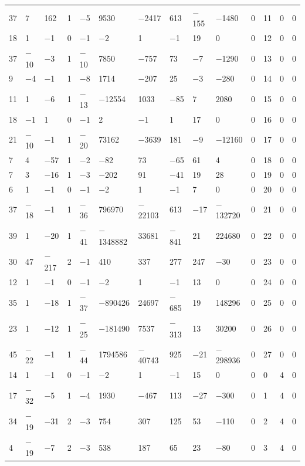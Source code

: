 \documentclass[pdftex]{sigma}
\numberwithin{equation}{section}
\theoremstyle{definition}
\numberwithin{table}{section}
\begin{document}
{\begin{paracol}{3}
\begin{supertabular}{|w{c}{.32cm}w{c}{.32cm}w{c}{.32cm}@{\hspace{.5cm}}w{c}{.2cm}w{c}{.2cm}|@{\hspace{\tabcolsep}}HHHHHHw{c}{.17cm}w{c}{.17cm}w{c}{.17cm}|}
			37 & 7 & 162 & 1 & $-$5 & 9530 & $-$2417 & 613 & $-$155 & $-$1480 & 0 & 11 & 0 & 0 \\
			18 & 1 & $-$1 & 0 & $-$1 & $-$2 & 1 & $-$1 & 19 & 0 & 0 & 12 & 0 & 0 \\
			37 & $-$10 & $-$3 & 1 & $-$10 & 7850 & $-$757 & 73 & $-$7 & $-$1290 & 0 & 13 & 0 & 0 \\
			9 & $-$4 & $-$1 & 1 & $-$8 & 1714 & $-$207 & 25 & $-$3 & $-$280 & 0 & 14 & 0 & 0 \\
			11 & 1 & $-$6 & 1 & $-$13 & $-$12554 & 1033 & $-$85 & 7 & 2080 & 0 & 15 & 0 & 0 \\
			18 & $-$1 & 1 & 0 & $-$1 & 2 & $-$1 & 1 & 17 & 0 & 0 & 16 & 0 & 0 \\
			21 & $-$10 & $-$1 & 1 & $-$20 & 73162 & $-$3639 & 181 & $-$9 & $-$12160 & 0 & 17 & 0 & 0 \\
			7 & 4 & $-$57 & 1 & $-$2 & $-$82 & 73 & $-$65 & 61 & 4 & 0 & 18 & 0 & 0 \\
			7 & 3 & $-$16 & 1 & $-$3 & $-$202 & 91 & $-$41 & 19 & 28 & 0 & 19 & 0 & 0 \\
			6 & 1 & $-$1 & 0 & $-$1 & $-$2 & 1 & $-$1 & 7 & 0 & 0 & 20 & 0 & 0 \\
			37 & $-$18 & $-$1 & 1 & $-$36 & 796970 & $-$22103 & 613 & $-$17 & $-$132720 & 0 & 21 & 0 & 0 \\
			39 & 1 & $-$20 & 1 & $-$41 & $-$1348882 & 33681 & $-$841 & 21 & 224680 & 0 & 22 & 0 & 0 \\
			30 & 47 & $-$217 & 2 & $-$1 & 410 & 337 & 277 & 247 & $-$30 & 0 & 23 & 0 & 0 \\
			12 & 1 & $-$1 & 0 & $-$1 & $-$2 & 1 & $-$1 & 13 & 0 & 0 & 24 & 0 & 0 \\
			35 & 1 & $-$18 & 1 & $-$37 & $-$890426 & 24697 & $-$685 & 19 & 148296 & 0 & 25 & 0 & 0 \\
			23 & 1 & $-$12 & 1 & $-$25 & $-$181490 & 7537 & $-$313 & 13 & 30200 & 0 & 26 & 0 & 0 \\
			45 & $-$22 & $-$1 & 1 & $-$44 & 1794586 & $-$40743 & 925 & $-$21 & $-$298936 & 0 & 27 & 0 & 0 \\
			14 & 1 & $-$1 & 0 & $-$1 & $-$2 & 1 & $-$1 & 15 & 0 & 0 & 0 & 4 & 0 \\
			17 & $-$32 & $-$5 & 1 & $-$4 & 1930 & $-$467 & 113 & $-$27 & $-$300 & 0 & 1 & 4 & 0 \\
			34 & $-$19 & $-$31 & 2 & $-$3 & 754 & 307 & 125 & 53 & $-$110 & 0 & 2 & 4 & 0 \\
			4 & $-$19 & $-$7 & 2 & $-$3 & 538 & 187 & 65 & 23 & $-$80 & 0 & 3 & 4 & 0 \\

\end{supertabular}
\end{paracol}}
\end{document}
